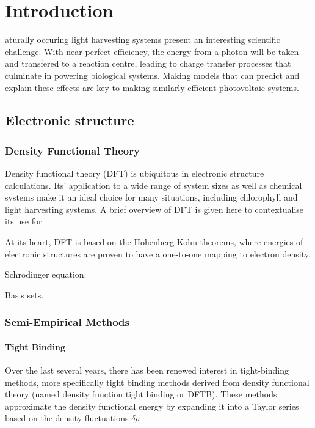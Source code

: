 %
%
\let\textcircled=\pgftextcircled
\chapter{Introduction}
\label{chap:intro}

aturally occuring light harvesting systems present an interesting 
scientific challenge. With near perfect efficiency\cite{Scholes2011}, the energy 
from a photon will be taken and transfered to a reaction centre, leading to charge
transfer processes that culminate in powering biological systems. Making models 
that can predict and explain these effects are key to making similarly efficient 
photovoltaic systems.

\section{Electronic structure}
\label{sec:electronic_structure}

\subsection{Density Functional Theory}
\label{subsec:dft}

Density functional theory (DFT) is ubiquitous in electronic structure calculations.
Its' application to a wide range of system sizes as well as chemical systems make 
it an ideal choice for many situations, including chlorophyll and light harvesting
systems. A brief overview of DFT is given here to contextualise its use for 

At its heart, DFT is based on the Hohenberg-Kohn theorems, where energies of electronic
structures are proven to have a one-to-one mapping to electron density.

Schrodinger equation.

Basis sets.



\subsection{Semi-Empirical Methods}
\label{subsec:xtb_theory}

\subsubsection{Tight Binding}
Over the last several years, there has been renewed interest in tight-binding methods, 
more specifically tight binding methods derived from density functional theory 
(named density function tight binding or DFTB)\cite{Porezag1994}. These methods
approximate the density functional energy by expanding it into a Taylor series based 
on the density fluctuations $\delta\rho$\cite{Koskinen2009}

